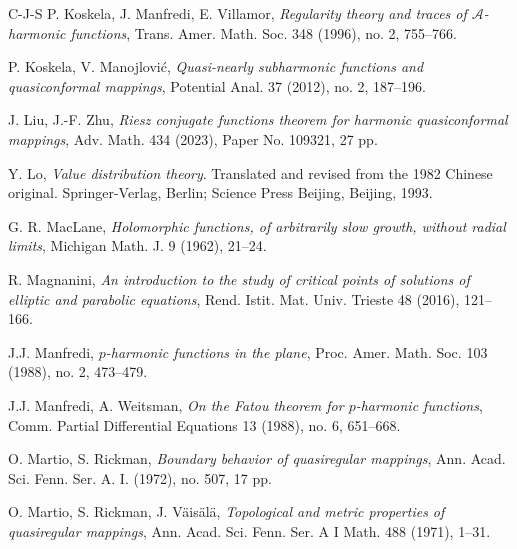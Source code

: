 \documentclass[11pt,a4paper,reqno]{amsart}
\theoremstyle{definition}
\newcommand{\A}{\mathcal{A}}
\numberwithin{komcounter}{section}
\begin{document}
\begin{thebibliography}{C-J-S}
 P. Koskela, J. Manfredi, E. Villamor, \emph{Regularity theory and traces of $\A$-harmonic functions},
Trans. Amer. Math. Soc. 348 (1996), no. 2, 755--766.


 P. Koskela, V. Manojlovi\'c, \emph{Quasi-nearly subharmonic functions and quasiconformal mappings},  Potential Anal. 37 (2012), no. 2, 187--196.

 J. Liu, J.-F. Zhu, \emph{Riesz conjugate functions theorem for harmonic quasiconformal mappings}, Adv. Math. 434 (2023), Paper No. 109321, 27 pp.

 Y. Lo, \emph{Value distribution theory}. Translated and revised from the 1982 Chinese original.
Springer-Verlag, Berlin; Science Press Beijing, Beijing, 1993.






 G. R. MacLane, \emph{Holomorphic functions, of arbitrarily slow growth, without radial limits},
Michigan Math. J. 9 (1962), 21--24.

 R. Magnanini, \emph{An introduction to the study of critical points of solutions of elliptic and parabolic equations}, Rend. Istit. Mat. Univ. Trieste 48 (2016), 121--166. 


 J.J. Manfredi, \emph{$p$-harmonic functions in the plane}, Proc. Amer. Math. Soc. 103 (1988), no. 2, 473--479.

 J.J. Manfredi, A. Weitsman, \emph{On the Fatou theorem for $p$-harmonic functions}, 
Comm. Partial Differential Equations 13 (1988), no. 6, 651--668.



 O. Martio, S. Rickman, \emph{Boundary behavior of quasiregular mappings}, Ann. Acad. Sci. Fenn. Ser. A. I. (1972), no. 507, 17 pp.

 O. Martio, S. Rickman, J.  V\"ais\"al\"a, \emph{Topological and metric properties of quasiregular mappings}, Ann. Acad. Sci. Fenn. Ser. A I Math. 488 (1971), 1--31.


\end{thebibliography}
\end{document}
